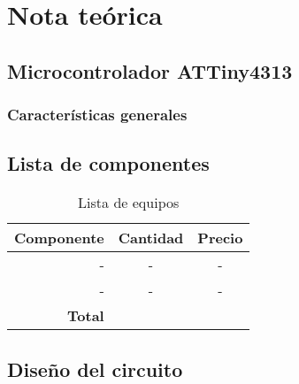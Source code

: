\section{Nota teórica}

\subsection*{Microcontrolador ATTiny4313}

\subsubsection*{Características generales}
\subsection*{Lista de componentes}

\begin{table}[H]
\caption{Lista de equipos}
\label{table_2}
\begin{center}
\begin{tabular}{r|cc}
\hline
\textbf{Componente}&\textbf{Cantidad}&\textbf{Precio}\\
 \hline
- &-  &- \\  
-& - &- \\ \hline
 \textbf{Total}& &  \\
 \hline
\end{tabular}
\end{center}
\end{table}

\subsection*{Diseño del circuito}

\newpage